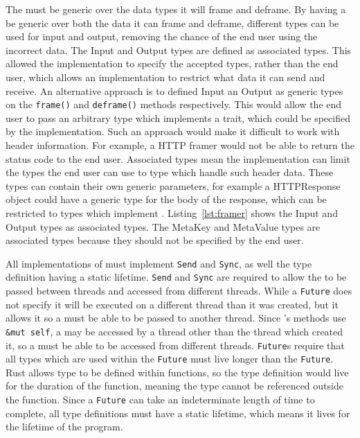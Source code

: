 The \framer{} must be generic over the data types it will frame and deframe.
By having a \framer{} be generic over both the data it can frame and deframe, different types can be used for input
and output, removing the chance of the end user using the incorrect data.
The Input and Output types are defined as associated types.
This allowed the implementation to specify the accepted types, rather than the end user, which allows an implementation to
restrict what data it can send and receive.
An alternative approach is to defined Input an Output as generic types on the \texttt{frame()} and \texttt{deframe()}
methods respectively.
This would allow the end user to pass an arbitrary type which implements a trait, which could be specified by the
implementation.
Such an approach would make it difficult to work with header information.
For example, a HTTP framer would not be able to return the status code to the end user.
Associated types mean the implementation can limit the types the end user can use to type which handle such header data.
These types can contain their own generic parameters, for example a HTTPResponse object could have a generic type for
the body of the response, which can be restricted to types which implement \decode{}.
Listing~\ref{lst:framer} shows the Input and Output types as associated types.
The MetaKey and MetaValue types are associated types because they should not be specified by the end user.

All implementations of \framer{} must implement \texttt{Send} and \texttt{Sync}, as well the type definition having
a static lifetime.
\texttt{Send} and \texttt{Sync} are required to allow the \framer{} to be passed between threads and accessed from
different threads.
While a \texttt{Future} does not specify it will be executed on a different thread than it was created, but it allows
it so a \framer{} must be able to be passed to another thread.
Since \framer{}'s methods use \texttt{\&mut self}, a \framer{} may be accessed by a thread other than the thread
which created it, so a \framer{} must be able to be accessed from different threads.
\texttt{Future}s require that all types which are used within the \texttt{Future} must live longer than the
\texttt{Future}.
Rust allows type to be defined within functions, so the type definition would live for the duration of the function,
meaning the type cannot be referenced outside the function.
Since a \texttt{Future} can take an indeterminate length of time to complete, all \framer{} type definitions must
have a static lifetime, which means it lives for the lifetime of the program.

